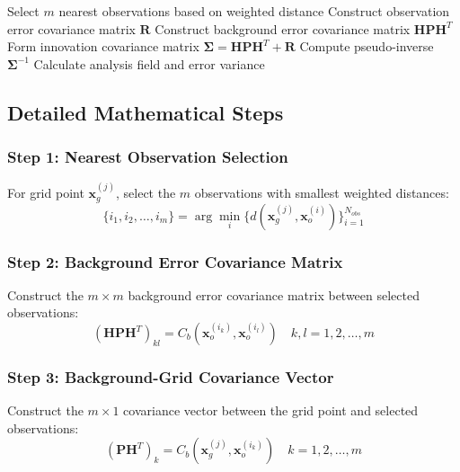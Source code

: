 \documentclass[11pt]{article}
\begin{document}
\begin{algorithm}
\caption{Optimal Interpolation at Grid Point}
\begin{algorithmic}[1]
\STATE Select $m$ nearest observations based on weighted distance
\STATE Construct observation error covariance matrix $\mathbf{R}$
\STATE Construct background error covariance matrix $\mathbf{H}\mathbf{P}\mathbf{H}^T$
\STATE Form innovation covariance matrix $\boldsymbol{\Sigma} = \mathbf{H}\mathbf{P}\mathbf{H}^T + \mathbf{R}$
\STATE Compute pseudo-inverse $\boldsymbol{\Sigma}^{-1}$
\STATE Calculate analysis field and error variance
\end{algorithmic}
\end{algorithm}

\subsection{Detailed Mathematical Steps}

\subsubsection{Step 1: Nearest Observation Selection}

For grid point $\mathbf{x}_g^{(j)}$, select the $m$ observations with smallest weighted distances:
\begin{equation}
\{i_1, i_2, \ldots, i_m\} = \arg\min_{i} \{d(\mathbf{x}_g^{(j)}, \mathbf{x}_o^{(i)})\}_{i=1}^{N_{obs}}
\end{equation}

\subsubsection{Step 2: Background Error Covariance Matrix}

Construct the $m \times m$ background error covariance matrix between selected observations:
\begin{equation}
(\mathbf{H}\mathbf{P}\mathbf{H}^T)_{kl} = C_b(\mathbf{x}_o^{(i_k)}, \mathbf{x}_o^{(i_l)}) \quad k,l = 1, 2, \ldots, m
\end{equation}

\subsubsection{Step 3: Background-Grid Covariance Vector}

Construct the $m \times 1$ covariance vector between the grid point and selected observations:
\begin{equation}
(\mathbf{P}\mathbf{H}^T)_k = C_b(\mathbf{x}_g^{(j)}, \mathbf{x}_o^{(i_k)}) \quad k = 1, 2, \ldots, m
\end{equation}
\end{document}
